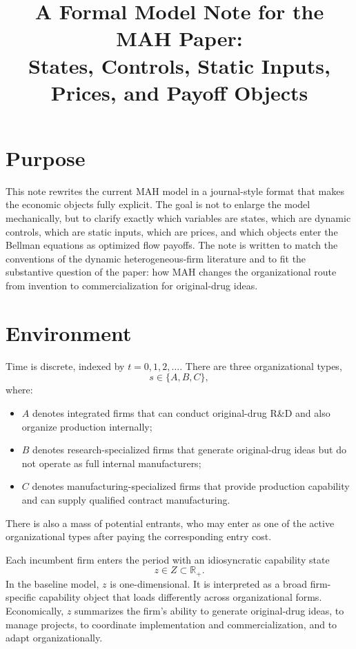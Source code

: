 \documentclass[12pt]{article}
\title{A Formal Model Note for the MAH Paper:\\
States, Controls, Static Inputs, Prices, and Payoff Objects}
\author{}
\date{}
\begin{document}
\maketitle

\section{Purpose}

This note rewrites the current MAH model in a journal-style format that makes the
economic objects fully explicit. The goal is not to enlarge the model mechanically,
but to clarify exactly which variables are states, which are dynamic controls, which
are static inputs, which are prices, and which objects enter the Bellman equations
as optimized flow payoffs. The note is written to match the conventions of the
dynamic heterogeneous-firm literature and to fit the substantive question of the
paper: how MAH changes the organizational route from invention to commercialization
for original-drug ideas.

\section{Environment}

Time is discrete, indexed by $t=0,1,2,\dots$. There are three organizational types,
\[
s\in\{A,B,C\},
\]
where:

\begin{itemize}[leftmargin=2em]
    \item $A$ denotes integrated firms that can conduct original-drug R\&D and also
    organize production internally;
    \item $B$ denotes research-specialized firms that generate original-drug ideas but
    do not operate as full internal manufacturers;
    \item $C$ denotes manufacturing-specialized firms that provide production capability
    and can supply qualified contract manufacturing.
\end{itemize}

There is also a mass of potential entrants, who may enter as one of the active organizational
types after paying the corresponding entry cost.

Each incumbent firm enters the period with an idiosyncratic capability state
\[
z\in Z\subset \mathbb{R}_+.
\]
In the baseline model, $z$ is one-dimensional. It is interpreted as a broad firm-specific
capability object that loads differently across organizational forms. Economically, $z$
summarizes the firm's ability to generate original-drug ideas, to manage projects,
to coordinate implementation and commercialization, and to adapt organizationally.
\end{document}
